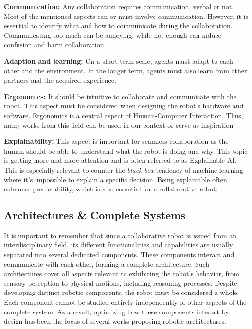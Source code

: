\textbf{Communication:} Any collaboration requires communication, verbal or not. Most of the mentioned aspects can or must involve communication. However, it is essential to identify what and how to communicate during the collaboration. Communicating too much can be annoying, while not enough can induce confusion and harm collaboration.

\textbf{Adaption and learning:} On a short-term scale, agents must adapt to each other and the environment. In the longer term, agents must also learn from other partners and the acquired experience.

\textbf{Ergonomics:} It should be intuitive to collaborate and communicate with the robot. This aspect must be considered when designing the robot's hardware and software. Ergonomics is a central aspect of Human-Computer Interaction. Thus, many works from this field can be used in our context or serve as inspiration.

\textbf{Explainability:} This aspect is important for seamless collaboration as the human should be able to understand what the robot is doing and why. This topic is getting more and more attention and is often referred to as Explainable AI. This is especially relevant to counter the \textit{black box} tendency of machine learning where it's impossible to explain a specific decision. Being explainable often enhances predictability, which is also essential for a collaborative robot.

\subsection{Architectures \& Complete Systems}

It is important to remember that since a collaborative robot is issued from an interdisciplinary field, its different functionalities and capabilities are usually separated into several dedicated components. These components interact and communicate with each other, forming a complete architecture. Such architectures cover all aspects relevant to exhibiting the robot's behavior, from sensory perception to physical motions, including reasoning processes. 
Despite developing distinct robotic components, the robot must be considered a whole. Each component cannot be studied entirely independently of other aspects of the complete system. As a result, optimizing how these components interact by design has been the focus of several works proposing robotic architectures.

